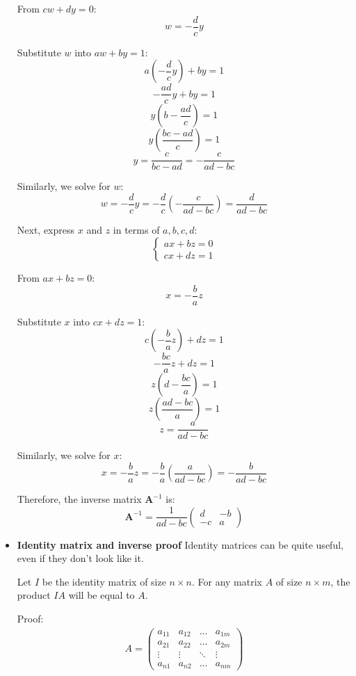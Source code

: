 \documentclass[a4paper,12pt]{article}
\begin{document}
\begin{itemize}[leftmargin=*]
From \( cw + dy = 0 \):
\[
w = -\frac{d}{c} y
\]

Substitute \( w \) into \( aw + by = 1 \):
\[
a\left( -\frac{d}{c} y \right) + by = 1
\]
\[
-\frac{ad}{c} y + by = 1
\]
\[
y \left( b - \frac{ad}{c} \right) = 1
\]
\[
y \left( \frac{bc - ad}{c} \right) = 1
\]
\[
y = \frac{c}{bc - ad} = -\frac{c}{ad - bc}
\]

Similarly, we solve for \( w \):
\[
w = -\frac{d}{c} y = -\frac{d}{c} \left( -\frac{c}{ad - bc} \right) = \frac{d}{ad - bc}
\]

Next, express \( x \) and \( z \) in terms of \( a, b, c, d \):
\[
\begin{cases}
ax + bz = 0 \\
cx + dz = 1
\end{cases}
\]

From \( ax + bz = 0 \):
\[
x = -\frac{b}{a} z
\]

Substitute \( x \) into \( cx + dz = 1 \):
\[
c \left( -\frac{b}{a} z \right) + dz = 1
\]
\[
-\frac{bc}{a} z + dz = 1
\]
\[
z \left( d - \frac{bc}{a} \right) = 1
\]
\[
z \left( \frac{ad - bc}{a} \right) = 1
\]
\[
z = \frac{a}{ad - bc}
\]

Similarly, we solve for \( x \):
\[
x = -\frac{b}{a} z = -\frac{b}{a} \left( \frac{a}{ad - bc} \right) = -\frac{b}{ad - bc}
\]

Therefore, the inverse matrix \( \mathbf{A}^{-1} \) is:
\[
\mathbf{A}^{-1} = \frac{1}{ad - bc} \begin{pmatrix}
d & -b \\
-c & a
\end{pmatrix}
\]
    
    \item \textbf{Identity matrix and inverse proof}
    Identity matrices can be quite useful, even if they don't look like it.

    
Let $I$ be the identity matrix of size $n \times n$. For any matrix $A$ of size $n \times m$, the product $IA$ will be equal to $A$.

Proof:
    \begin{align}    
    A = \begin{pmatrix} a_{11} & a_{12} & \dots & a_{1m} \\ a_{21} & a_{22} & \dots & a_{2m} \\ \vdots & \vdots & \ddots & \vdots \\ a_{n1} & a_{n2} & \dots & a_{nm} \end{pmatrix}
    \end{align}
    

\end{itemize}
\end{document}

